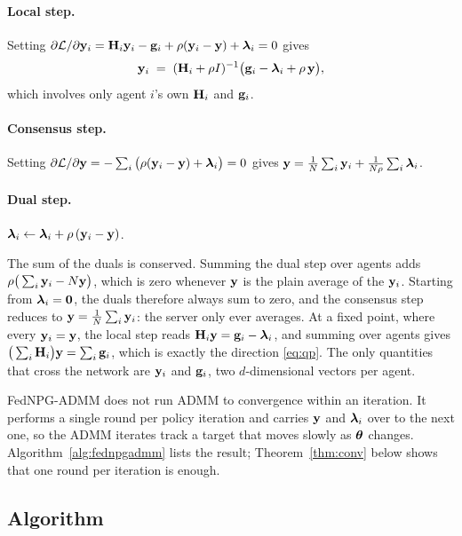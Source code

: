 \paragraph{Local step.} Setting
$\partial\mathcal{L}/\partial\mathbf{y}_i = \mathbf{H}_i\mathbf{y}_i - \mathbf{g}_i +
\rho(\mathbf{y}_i - \mathbf{y}) + \boldsymbol{\lambda}_i = 0$ gives
\begin{equation}
  \mathbf{y}_i \;=\; (\mathbf{H}_i + \rho I)^{-1}\big(\mathbf{g}_i - \boldsymbol{\lambda}_i + \rho\,\mathbf{y}\big),
  \label{eq:localstep}
\end{equation}
which involves only agent $i$'s own $\mathbf{H}_i$ and $\mathbf{g}_i$.

\paragraph{Consensus step.} Setting
$\partial\mathcal{L}/\partial\mathbf{y} = -\sum_i\big(\rho(\mathbf{y}_i - \mathbf{y}) +
\boldsymbol{\lambda}_i\big) = 0$ gives
$\mathbf{y} = \frac1N\sum_i \mathbf{y}_i + \frac{1}{N\rho}\sum_i\boldsymbol{\lambda}_i$.

\paragraph{Dual step.} $\boldsymbol{\lambda}_i \leftarrow \boldsymbol{\lambda}_i + \rho\,(\mathbf{y}_i - \mathbf{y})$.

\medskip
The sum of the duals is conserved. Summing the dual step over agents adds
$\rho\big(\sum_i\mathbf{y}_i - N\mathbf{y}\big)$, which is zero whenever $\mathbf{y}$ is the plain
average of the $\mathbf{y}_i$. Starting from $\boldsymbol{\lambda}_i = \mathbf{0}$, the duals
therefore always sum to zero, and the consensus step reduces to
$\mathbf{y} = \frac1N\sum_i\mathbf{y}_i$: the server only ever averages. At a fixed point,
where every $\mathbf{y}_i = \mathbf{y}$, the local step reads $\mathbf{H}_i\mathbf{y} = \mathbf{g}_i - \boldsymbol{\lambda}_i$,
and summing over agents gives $\big(\sum_i\mathbf{H}_i\big)\mathbf{y} = \sum_i\mathbf{g}_i$, which
is exactly the direction \eqref{eq:qp}. The only quantities that cross the
network are $\mathbf{y}_i$ and $\mathbf{g}_i$, two $d$-dimensional vectors per agent.

FedNPG-ADMM does not run ADMM to convergence within an iteration. It performs
a single round per policy iteration and carries $\mathbf{y}$ and $\boldsymbol{\lambda}_i$ over to the
next one, so the ADMM iterates track a target that moves slowly as $\boldsymbol{\theta}$
changes. Algorithm~\ref{alg:fednpgadmm} lists the result; Theorem~\ref{thm:conv}
below shows that one round per iteration is enough.

\subsection{Algorithm}

